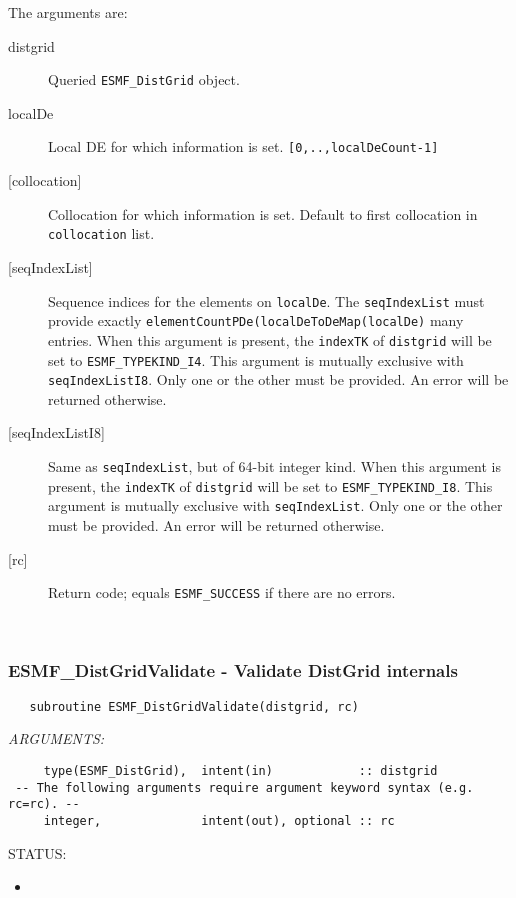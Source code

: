      The arguments are:
     \begin{description}
     \item[distgrid]
       Queried {\tt ESMF\_DistGrid} object.
     \item[localDe]
       Local DE for which information is set. {\tt [0,..,localDeCount-1]}
     \item[{[collocation]}]
       Collocation for which information is set. Default to first
       collocation in {\tt collocation} list.
     \item[{[seqIndexList]}]
       Sequence indices for the elements on {\tt localDe}. The {\tt seqIndexList}
       must provide exactly {\tt elementCountPDe(localDeToDeMap(localDe)} many
       entries. When this argument is present, the {\tt indexTK} of
       {\tt distgrid} will be set to {\tt ESMF\_TYPEKIND\_I4}.
       This argument is mutually exclusive with {\tt seqIndexListI8}. Only one
       or the other must be provided. An error will be returned otherwise.
     \item[{[seqIndexListI8]}]
       Same as {\tt seqIndexList}, but of 64-bit integer kind.
       When this argument is present, the {\tt indexTK} of
       {\tt distgrid} will be set to {\tt ESMF\_TYPEKIND\_I8}.
       This argument is mutually exclusive with {\tt seqIndexList}. Only one
       or the other must be provided. An error will be returned otherwise.
     \item[{[rc]}]
       Return code; equals {\tt ESMF\_SUCCESS} if there are no errors.
     \end{description}
   
 
\mbox{}\hrulefill\ 
 
\subsubsection [ESMF\_DistGridValidate] {ESMF\_DistGridValidate - Validate DistGrid internals}


 
\begin{verbatim}   subroutine ESMF_DistGridValidate(distgrid, rc)\end{verbatim}{\em ARGUMENTS:}
\begin{verbatim}     type(ESMF_DistGrid),  intent(in)            :: distgrid
 -- The following arguments require argument keyword syntax (e.g. rc=rc). --
     integer,              intent(out), optional :: rc  
           \end{verbatim}
{\sf STATUS:}
   \begin{itemize}
   \item{}
   \end{itemize}
  
